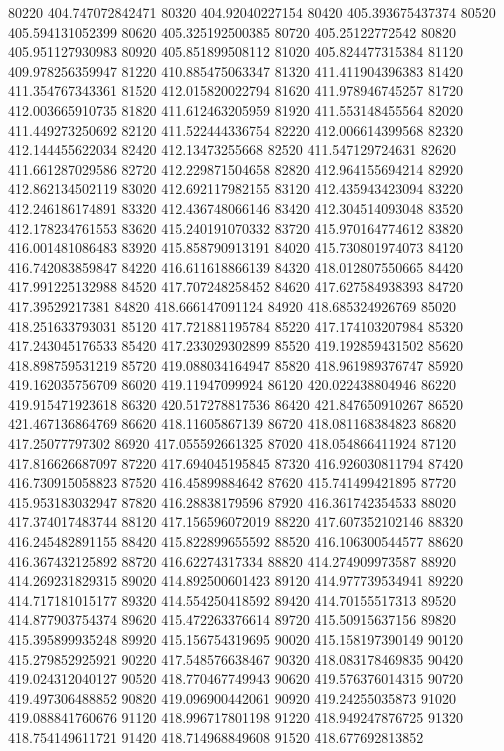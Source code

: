 {80220 404.747072842471
80320 404.92040227154
80420 405.393675437374
80520 405.594131052399
80620 405.325192500385
80720 405.25122772542
80820 405.951127930983
80920 405.851899508112
81020 405.824477315384
81120 409.978256359947
81220 410.885475063347
81320 411.411904396383
81420 411.354767343361
81520 412.015820022794
81620 411.978946745257
81720 412.003665910735
81820 411.612463205959
81920 411.553148455564
82020 411.449273250692
82120 411.522444336754
82220 412.006614399568
82320 412.144455622034
82420 412.13473255668
82520 411.547129724631
82620 411.661287029586
82720 412.229871504658
82820 412.964155694214
82920 412.862134502119
83020 412.692117982155
83120 412.435943423094
83220 412.246186174891
83320 412.436748066146
83420 412.304514093048
83520 412.178234761553
83620 415.240191070332
83720 415.970164774612
83820 416.001481086483
83920 415.858790913191
84020 415.730801974073
84120 416.742083859847
84220 416.611618866139
84320 418.012807550665
84420 417.991225132988
84520 417.707248258452
84620 417.627584938393
84720 417.39529217381
84820 418.666147091124
84920 418.685324926769
85020 418.251633793031
85120 417.721881195784
85220 417.174103207984
85320 417.243045176533
85420 417.233029302899
85520 419.192859431502
85620 418.898759531219
85720 419.088034164947
85820 418.961989376747
85920 419.162035756709
86020 419.11947099924
86120 420.022438804946
86220 419.915471923618
86320 420.517278817536
86420 421.847650910267
86520 421.467136864769
86620 418.11605867139
86720 418.081168384823
86820 417.25077797302
86920 417.055592661325
87020 418.054866411924
87120 417.816626687097
87220 417.694045195845
87320 416.926030811794
87420 416.730915058823
87520 416.45899884642
87620 415.741499421895
87720 415.953183032947
87820 416.28838179596
87920 416.361742354533
88020 417.374017483744
88120 417.156596072019
88220 417.607352102146
88320 416.245482891155
88420 415.822899655592
88520 416.106300544577
88620 416.367432125892
88720 416.62274317334
88820 414.274909973587
88920 414.269231829315
89020 414.892500601423
89120 414.977739534941
89220 414.717181015177
89320 414.554250418592
89420 414.70155517313
89520 414.877903754374
89620 415.472263376614
89720 415.50915637156
89820 415.395899935248
89920 415.156754319695
90020 415.158197390149
90120 415.279852925921
90220 417.548576638467
90320 418.083178469835
90420 419.024312040127
90520 418.770467749943
90620 419.576376014315
90720 419.497306488852
90820 419.096900442061
90920 419.24255035873
91020 419.088841760676
91120 418.996717801198
91220 418.949247876725
91320 418.754149611721
91420 418.714968849608
91520 418.677692813852
}
